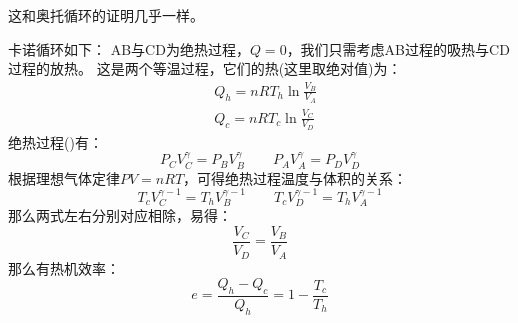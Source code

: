         \begin{prove}
            这和奥托循环的证明几乎一样。

            卡诺循环如下：
            AB与CD为绝热过程，$Q = 0$，我们只需考虑AB过程的吸热与CD过程的放热。
            这是两个等温过程，它们的热(这里取绝对值)为：
            \begin{equation}
                \begin{aligned}
                    &Q_{h} = nRT_{h}\ln\frac{V_B}{V_A}\\[1ex]
                    &Q_{c} = nRT_{c}\ln\frac{V_C}{V_D}
                \end{aligned}
                \nonumber
            \end{equation}
            绝热过程()有：
            \begin{equation}
                P_{C}V_{C}^{\gamma} = P_{B}V_{B}^{\gamma} \qquad   P_{A}V_{A}^{\gamma} = P_{D}V_{D}^{\gamma}
                \nonumber
            \end{equation}
            根据理想气体定律$PV=nRT$，可得绝热过程温度与体积的关系：
            \begin{equation}
                T_{c}V_{C}^{\gamma-1} = T_{h}V_{B}^{\gamma-1} \qquad T_{c}V_{D}^{\gamma-1} = T_{h}V_{A}^{\gamma-1}
                \nonumber
            \end{equation}
            那么两式左右分别对应相除，易得：
            \begin{equation}
                \frac{V_C}{V_D} = \frac{V_B}{V_A}
                \nonumber
            \end{equation}
            那么有热机效率：
            \begin{equation}
                e = \frac{Q_{h}-Q_{c}}{Q_{h}} = 1 - \frac{T_{c}}{T_{h}}
            \end{equation}
        \end{prove}
